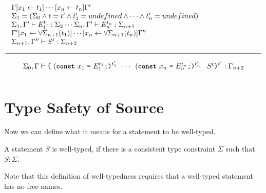 \[
\Rule{
  \begin{minipage}{120mm}
    $\Gamma[x_1 \leftarrow t_1]\cdots[x_n \leftarrow t_n]\Gamma' $\\
    $\Sigma_1 = (\Sigma_0 \wedge t = t' \wedge t'_1 = undefined \wedge \cdots \wedge t'_n = undefined)$ \\
    $\Sigma_1, \Gamma' \vdash E_1^{t_1} : \Sigma_2 \cdots
     \Sigma_n, \Gamma' \vdash E_n^{t_n} : \Sigma_{n+1}$\\
    $\Gamma'[x_1 \leftarrow \forall \Sigma_{n+1}(t_1)]\cdots[x_n \leftarrow \forall \Sigma_{n+1}(t_n)]\Gamma'' $\\
    $\Sigma_{n+1}, \Gamma'' \vdash S^t : \Sigma_{n+2}$
  \end{minipage}
}{
  \Sigma_0, \Gamma \vdash \Lc\
  (\Const\ x_1 \ \texttt{=}\ E_1^{t_1} \texttt{;)}^{t'_1} \texttt{ } \cdots \texttt{ }
  (\Const\ x_n \ \texttt{=}\ E_n^{t_n} \texttt{;)}^{t'_n} \texttt{ } \ S^t \Rc^{t'} : \Gamma_{n+2}
}
\]

\section{Type Safety of Source}
\label{simplsafe}

Now we can define what it means for a statement to be well-typed. 

\begin{definition}
A statement $S$ is
well-typed, if there is a consistent type constraint $\Sigma$ such that $S: \Sigma$.
\end{definition}

Note that this definition
of well-typedness requires that a well-typed statement has no free 
names.



